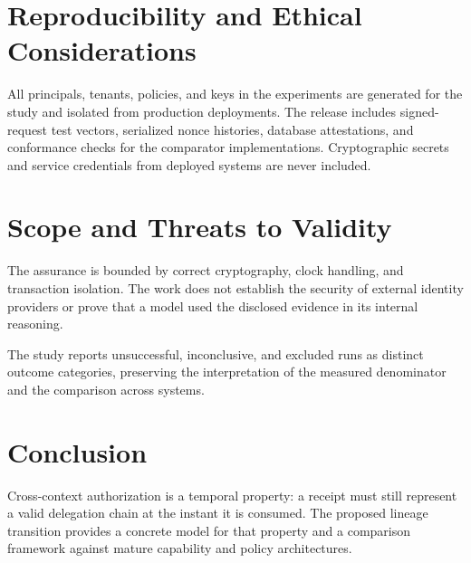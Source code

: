 \documentclass[11pt,a4paper]{article}
\begin{document}
\section{Reproducibility and Ethical Considerations}
All principals, tenants, policies, and keys in the experiments are generated for the study and isolated from production deployments. The release includes signed-request test vectors, serialized nonce histories, database attestations, and conformance checks for the comparator implementations. Cryptographic secrets and service credentials from deployed systems are never included.

\section{Scope and Threats to Validity}
The assurance is bounded by correct cryptography, clock handling, and transaction isolation. The work does not establish the security of external identity providers or prove that a model used the disclosed evidence in its internal reasoning.

The study reports unsuccessful, inconclusive, and excluded runs as distinct outcome categories, preserving the interpretation of the measured denominator and the comparison across systems.

\section{Conclusion}
Cross-context authorization is a temporal property: a receipt must still represent a valid delegation chain at the instant it is consumed. The proposed lineage transition provides a concrete model for that property and a comparison framework against mature capability and policy architectures.



\end{document}
